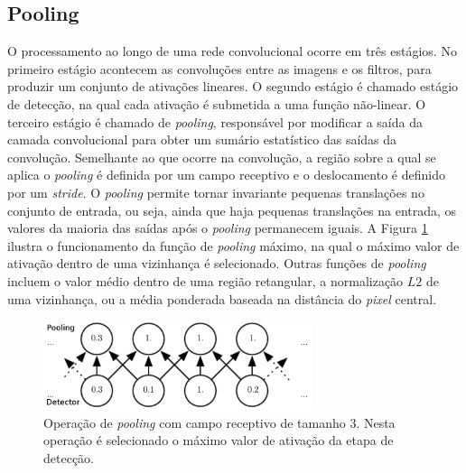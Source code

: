 \subsection{Pooling}
O processamento ao longo de uma rede convolucional ocorre em três estágios. No primeiro estágio
acontecem as convoluções entre as imagens e os filtros, para produzir um conjunto de ativações lineares.
O segundo estágio é chamado estágio de detecção, na qual cada ativação é submetida a uma
função não-linear. O terceiro estágio é chamado de \textit{pooling}, responsável por
modificar a saída da camada convolucional para obter um sumário estatístico das saídas da convolução.
Semelhante ao que ocorre na convolução, a região sobre a qual se aplica o \textit{pooling} é definida por um
campo receptivo e o deslocamento é definido por um \textit{stride}. O \textit{pooling} permite tornar
invariante pequenas translações no conjunto de entrada, ou seja, ainda que haja pequenas translações na
entrada, os valores da maioria das saídas após o \textit{pooling} permanecem iguais.
A Figura \ref{fig:pool} ilustra o funcionamento da função de \textit{pooling} máximo, na qual
o máximo valor de ativação dentro de uma vizinhança é selecionado. Outras funções de \textit{pooling} incluem o valor médio
dentro de uma região retangular, a normalização $L2$ de uma vizinhança, ou a média ponderada baseada na distância do \textit{pixel} central.
\begin{figure}[htp]
\begin{center}
  \includegraphics[width=0.7\textwidth]{fig/pool}
  \caption{Operação de \textit{pooling} com campo receptivo de tamanho $3$. Nesta operação é selecionado o máximo valor de ativação da etapa de detecção.}
  \label{fig:pool}
\end{center}
\end{figure}

